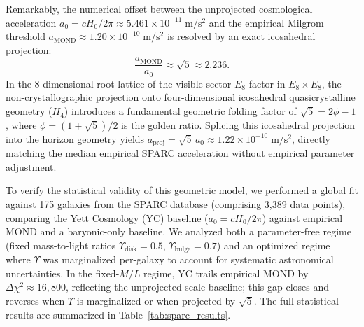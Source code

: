 \documentclass[twocolumn,amsmath,amssymb,floatfix]{article}
\begin{document}
Remarkably, the numerical offset between the unprojected cosmological acceleration $a_0 = c H_0 / 2\pi \approx 5.461 \times 10^{-11}\;\mathrm{m/s^2}$ and the empirical Milgrom threshold $a_{\text{MOND}} \approx 1.20 \times 10^{-10}\;\mathrm{m/s^2}$ is resolved by an exact icosahedral projection:
\begin{equation}
    \frac{a_{\text{MOND}}}{a_0} \approx \sqrt{5} \approx 2.236.
\end{equation}
In the 8-dimensional root lattice of the visible-sector $E_8$ factor in $E_8 \times E_8$, the non-crystallographic projection onto four-dimensional icosahedral quasicrystalline geometry ($H_4$) introduces a fundamental geometric folding factor of $\sqrt{5} = 2\phi - 1$, where $\phi = (1+\sqrt{5})/2$ is the golden ratio. Splicing this icosahedral projection into the horizon geometry yields $a_{\text{proj}} = \sqrt{5}\,a_0 \approx 1.22 \times 10^{-10}\;\mathrm{m/s^2}$, directly matching the median empirical SPARC acceleration without empirical parameter adjustment.

To verify the statistical validity of this geometric model, we performed a global fit against 175 galaxies from the SPARC database (comprising 3,389 data points), comparing the Yett Cosmology (YC) baseline ($a_0 = c H_0 / 2\pi$) against empirical MOND and a baryonic-only baseline. We analyzed both a parameter-free regime (fixed mass-to-light ratios $\Upsilon_{\text{disk}}=0.5$, $\Upsilon_{\text{bulge}}=0.7$) and an optimized regime where $\Upsilon$ was marginalized per-galaxy to account for systematic astronomical uncertainties. In the fixed-$M/L$ regime, YC trails empirical MOND by $\Delta\chi^2 \approx 16,800$, reflecting the unprojected scale baseline; this gap closes and reverses when $\Upsilon$ is marginalized or when projected by $\sqrt{5}$. The full statistical results are summarized in Table~\ref{tab:sparc_results}.
\end{document}
